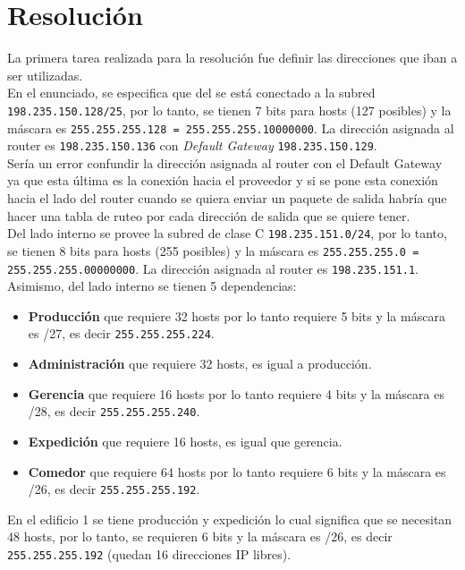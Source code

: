 \section{Resolución}

La primera tarea realizada para la resolución fue definir las direcciones que iban a ser utilizadas.\\

En el enunciado, se especifica que del se está conectado a la subred \texttt{198.235.150.128/25}, por lo tanto, se tienen 7 bits para hosts (127 posibles) y la máscara es \texttt{255.255.255.128 = 255.255.255.10000000}. La dirección asignada al router es \texttt{198.235.150.136} con \textit{Default Gateway} \texttt{198.235.150.129}.\\

Sería un error confundir la dirección asignada al router con el Default Gateway ya que esta última es la conexión hacia el proveedor y si se pone esta conexión hacia el lado del router cuando se quiera enviar un paquete de salida habría que hacer una tabla de ruteo por cada dirección de salida que se quiere tener.\\

Del lado interno se provee la subred de clase C \texttt{198.235.151.0/24}, por lo tanto, se tienen 8 bits para hosts (255 posibles) y la máscara es \texttt{255.255.255.0 = 255.255.255.00000000}. La dirección asignada al router es \texttt{198.235.151.1}.\\

Asimismo, del lado interno se tienen 5 dependencias:
\begin{itemize}
    \item \textbf{Producción} que requiere 32 hosts por lo tanto requiere 5 bits y la máscara es /27, es decir \texttt{255.255.255.224}.
    \item \textbf{Administración} que requiere 32 hosts, es igual a producción.
    \item \textbf{Gerencia} que requiere 16 hosts por lo tanto requiere 4 bits y la máscara es /28, es decir \texttt{255.255.255.240}.
    \item \textbf{Expedición} que requiere 16 hosts, es igual que gerencia.
    \item \textbf{Comedor} que requiere 64 hosts por lo tanto requiere 6 bits y la máscara es /26, es decir \texttt{255.255.255.192}.
\end{itemize}

En el edificio 1 se tiene producción y expedición lo cual significa que se necesitan 48 hosts, por lo tanto, se requieren 6 bits y la máscara es /26, es decir \texttt{255.255.255.192} (quedan 16 direcciones IP libres).\\

